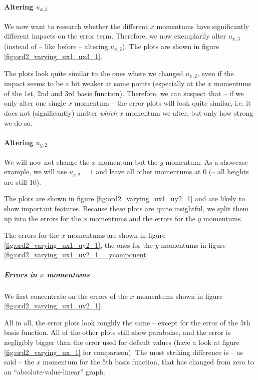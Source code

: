 \documentclass{article}
\begin{document}
\paragraph{\texorpdfstring{Altering $u_{x,3}$}{Altering ux3}}

We now want to research whether the different $x$ momentums have significantly different impacts on the error term. Therefore, we now exemplarily alter $u_{x,3}$ (instead of -- like before -- altering $u_{x,2}$). The plots are shown in figure \ref{fig:ord2_varying_ux1_ux3_1}.



The plots look quite similar to the ones where we changed $u_{x,2}$, even if the impact seems to be a bit weaker at some points (especially at the $x$ momentums of the 1st, 2nd and 3rd basis function). Therefore, we can suspect that -- if we only alter one single $x$ momentum -- the error plots will look quite similar, i.e. it does not (significantly) matter \emph{which} $x$ momentum we alter, but only how strong we do so.

\paragraph{\texorpdfstring{Altering $u_{y,2}$}{Altering uy2}}

We will now not change the $x$ momentum but the $y$ momentum. As a showcase example, we will use $u_{y,2}=1$ and leave all other momentums at 0 (-- all heights are still 10).

The plots are shown in figure \ref{fig:ord2_varying_ux1_uy2_1} and are likely to show important features. Because these plots are quite insightful, we split them up into the errors for the $x$ momentums and the errors for the $y$ momentums.

The errors for the $x$ momentums are shown in figure \ref{fig:ord2_varying_ux1_uy2_1}, the ones for the $y$ momentums in figure \ref{fig:ord2_varying_ux1_uy2_1__ycomponent}.

\subparagraph{\texorpdfstring{Errors in $x$ momentums}{Errors in x momentums}}

We first concentrate on the errors of the $x$ momentums shown in figure \ref{fig:ord2_varying_ux1_uy2_1}.



All in all, the error plots look roughly the same -- except for the error of the 5th basis function. All of the other plots still show parabolae, and the error is negligibly bigger than the error used for default values (have a look at figure \ref{fig:ord2_varying_ux_1} for comparison). The most striking difference is -- as said -- the $x$ momentum for the 5th basis function, that has changed from zero to an ``absolute-value-linear'' graph.
\end{document}
